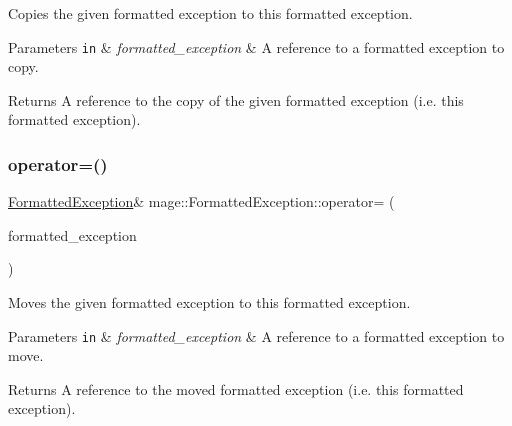 Copies the given formatted exception to this formatted exception.


\begin{DoxyParams}[1]{Parameters}
\mbox{\tt in}  & {\em formatted\+\_\+exception} & A reference to a formatted exception to copy. \\
\hline
\end{DoxyParams}
\begin{DoxyReturn}{Returns}
A reference to the copy of the given formatted exception (i.\+e. this formatted exception). 
\end{DoxyReturn}
\hypertarget{structmage_1_1_formatted_exception_ae35ad9e81efe8ed385792854036b4a14}{}\label{structmage_1_1_formatted_exception_ae35ad9e81efe8ed385792854036b4a14} 
\subsubsection{\texorpdfstring{operator=()}{operator=()}\hspace{0.1cm}{\footnotesize\ttfamily [2/2]}}
{\footnotesize\ttfamily \hyperlink{structmage_1_1_formatted_exception}{Formatted\+Exception}\& mage\+::\+Formatted\+Exception\+::operator= (\begin{DoxyParamCaption}\item[{\hyperlink{structmage_1_1_formatted_exception}{Formatted\+Exception} \&\&}]{formatted\+\_\+exception }\end{DoxyParamCaption})\hspace{0.3cm}{\ttfamily [default]}}

Moves the given formatted exception to this formatted exception.


\begin{DoxyParams}[1]{Parameters}
\mbox{\tt in}  & {\em formatted\+\_\+exception} & A reference to a formatted exception to move. \\
\hline
\end{DoxyParams}
\begin{DoxyReturn}{Returns}
A reference to the moved formatted exception (i.\+e. this formatted exception). 
\end{DoxyReturn}
\hypertarget{structmage_1_1_formatted_exception_a8fb8b53ee8d8cb73ac200bca84c067b2}{}\label{structmage_1_1_formatted_exception_a8fb8b53ee8d8cb73ac200bca84c067b2} 
